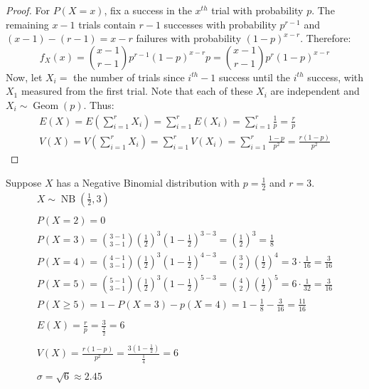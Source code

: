 \documentclass[letterpaper,12pt,fleqn]{article}
\DeclareMathOperator{\nb}{NB}
\DeclareMathOperator{\geom}{Geom}
\renewcommand{\o}{\sigma}
\begin{document}
\begin{proof}
  For \(P(X=x)\), fix a success in the \(x^{th}\) trial with probability \(p\).  The remaining \(x-1\) trials contain \(r-1\)
  successes with probability \(p^{r-1}\) and \((x-1)-(r-1)=x-r\) failures with probability \((1-p)^{x-r}\).  Therefore:
  \[f_X(x)=\binom{x-1}{r-1}p^{r-1}(1-p)^{x-r}p=\binom{x-1}{r-1}p^r(1-p)^{x-r}\]
  Now, let \(X_i=\) the number of trials since \(i^{th}-1\) success until the \(i^{th}\) success, with \(X_1\) measured from
  the first trial.  Note that each of these \(X_i\) are independent and \(X_i\sim\geom(p)\).  Thus:
  \begin{gather*}
    E(X)=E(\sum_{i=1}^rX_i)=\sum_{i=1}^rE(X_i)=\sum_{i=1}^r\frac{1}{p}=\frac{r}{p} \\
    V(X)=V(\sum_{i=1}^rX_i)=\sum_{i=1}^rV(X_i)=\sum_{i=1}^r\frac{1-p}{p^2}=\frac{r(1-p)}{p^2}
  \end{gather*}
\end{proof}

\begin{example}
  Suppose \(X\) has a Negative Binomial distribution with \(p=\frac{1}{2}\) and \(r=3\).
  \begin{gather*}
    X\sim\nb\left(\frac{1}{2},3\right) \\
    \\
    P(X=2)=0 \\
    P(X=3)=\binom{3-1}{3-1}\left(\frac{1}{2}\right)^3\left(1-\frac{1}{2}\right)^{3-3}=\left(\frac{1}{2}\right)^3=\frac{1}{8} \\
    P(X=4)=\binom{4-1}{3-1}\left(\frac{1}{2}\right)^3\left(1-\frac{1}{2}\right)^{4-3}=
    \binom{3}{2}\left(\frac{1}{2}\right)^4=3\cdot\frac{1}{16}=\frac{3}{16} \\
    P(X=5)=\binom{5-1}{3-1}\left(\frac{1}{2}\right)^3\left(1-\frac{1}{2}\right)^{5-3}=
    \binom{4}{2}\left(\frac{1}{2}\right)^5=6\cdot\frac{1}{32}=\frac{3}{16} \\
    P(X\ge5)=1-P(X=3)-p(X=4)=1-\frac{1}{8}-\frac{3}{16}=\frac{11}{16} \\
    \\
    E(X)=\frac{r}{p}=\frac{3}{\frac{1}{2}}=6 \\
    \\
    V(X)=\frac{r(1-p)}{p^2}=\frac{3(1-\frac{1}{2})}{\frac{1}{4}}=6 \\
    \\
    \o=\sqrt{6}\approx2.45
  \end{gather*}
\end{example}
\end{document}
